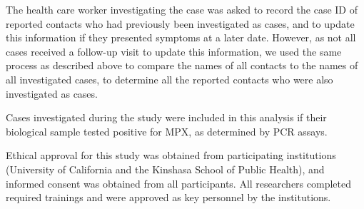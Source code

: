 The health care worker investigating the case was asked to record the case ID of reported contacts who had previously been investigated as cases, and to update this information if they presented symptoms at a later date. However, as not all cases received a follow-up visit to update this information, we used the same process as described above to compare the names of all contacts to the names of all investigated cases, to determine all the reported contacts who were also investigated as cases.


Cases investigated during the study were included in this analysis if their biological sample tested positive for MPX, as determined by PCR assays. 

Ethical approval for this study was obtained from participating institutions (University of California and the Kinshasa School of Public Health), and informed consent was obtained from all participants. All researchers completed required trainings and were approved as key personnel by the institutions. 





